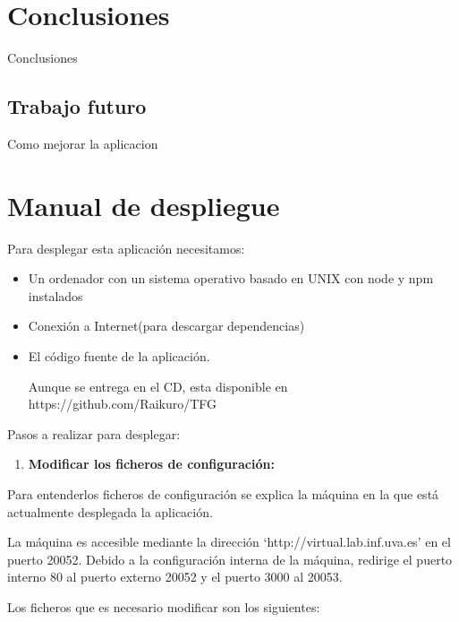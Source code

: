 \documentclass[openright,twoside,10pt]{book}
\providecommand{\tightlist}{%
  \setlength{\itemsep}{0pt}\setlength{\parskip}{0pt}}
\begin{document}
    \chapter{ Conclusiones }
    
    Conclusiones
    
    \section{Trabajo futuro}\label{trabajo-futuro}
    
    Como mejorar la aplicacion
    
    \appendix
    
    \chapter{ Manual de despliegue }
    
    Para desplegar esta aplicación necesitamos:
    
    \begin{itemize}
    \item
      Un ordenador con un sistema operativo basado en UNIX con node y npm
      instalados
    \item
      Conexión a Internet(para descargar dependencias)
    \item
      El código fuente de la aplicación.
    
      Aunque se entrega en el CD, esta disponible en
      https://github.com/Raikuro/TFG
    \end{itemize}
    
    Pasos a realizar para desplegar:
    
    \begin{enumerate}
    \def\labelenumi{\arabic{enumi}.}
    \tightlist
    \item
      \textbf{Modificar los ficheros de configuración:}
    \end{enumerate}
    
    Para entenderlos ficheros de configuración se explica la máquina en la
    que está actualmente desplegada la aplicación.
    
    La máquina es accesible mediante la dirección
    `http://virtual.lab.inf.uva.es' en el puerto 20052. Debido a la
    configuración interna de la máquina, redirige el puerto interno 80 al
    puerto externo 20052 y el puerto 3000 al 20053.
    
    Los ficheros que es necesario modificar son los siguientes:
    
\end{document}
